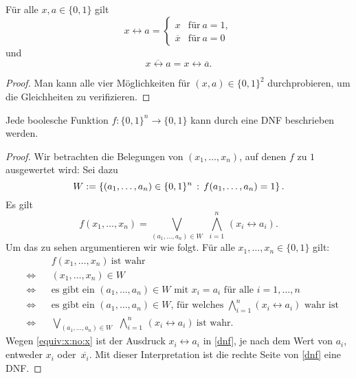 \begin{lem}
	Für alle $x, a \in \{0,1\}$ gilt
	\begin{equation} \label{equiv:x:no:x}
	x \leftrightarrow a = \begin{cases} 
		x & \text{für} \ a=1,
		\\				\overline{x} & \text{für} \ a=0
	\end{cases} 
	\end{equation}
	und 
	\begin{equation} \label{neg:equiv} 
		\overline{x \leftrightarrow a} = x \leftrightarrow \overline{a}. 
	\end{equation}
\end{lem} 
\begin{proof} 
	Man kann alle vier Möglichkeiten für $(x,a) \in \{0,1\}^2$ durchprobieren, um die Gleichheiten zu verifizieren. 
\end{proof} 

\begin{thm}
\label{thm:DNF}
	Jede boolesche Funktion $ f: \{0,1\}^n \to \{0,1\}$ kann durch eine DNF beschrieben werden. 
\end{thm} 
\begin{proof}
	Wir betrachten die Belegungen von $(x_1,\ldots,x_n)$, auf denen $f$ zu $1$ ausgewertet wird: 
	Sei dazu 
	\[
	W := \left\{  (a_1,\ldots,a_n) \in \{0,1\}^n \,:\, f(a_1,\ldots,a_n) = 1 \right\}. 
	\]
	Es gilt
	\begin{equation}
		\label{dnf}
		f(x_1,\ldots,x_n) = \bigvee_{ (a_1,\ldots,a_n) \in W} \ \, \bigwedge_{i=1}^n \, (x_i \leftrightarrow a_i). 
	\end{equation} 
	Um das zu sehen argumentieren wir wie folgt. Für alle $x_1,\ldots,x_n \in \{0,1\}$ gilt:
	\begin{align*}
		& & 	& f(x_1,\ldots,x_n) \ \text{ist wahr}  
	\\	& \Leftrightarrow &  & (x_1,\ldots,x_n) \in W
	\\	& \Leftrightarrow & & \text{es gibt ein $(a_1,\ldots,a_n) \in W$ mit $x_i=a_i$ für alle $i=1,\ldots,n$} 
	\\  & \Leftrightarrow & & \text{es gibt ein $(a_1,\ldots,a_n) \in W$, für welches $\bigwedge_{i=1}^n (x_i \leftrightarrow a_i)$ wahr ist}
	\\  & \Leftrightarrow & & \bigvee_{ (a_1,\ldots,a_n) \in W} \ \, \bigwedge_{i=1}^n \, (x_i \leftrightarrow a_i) \ \text{ist wahr}. 
	\end{align*} 
%
	Wegen \eqref{equiv:x:no:x} ist der Ausdruck $x_i \leftrightarrow a_i$ in \eqref{dnf}, je nach dem Wert von $a_i$, entweder $x_i$ oder~$\overline{x_i}$. Mit dieser Interpretation ist die rechte Seite von \eqref{dnf} eine DNF.
\end{proof} 

